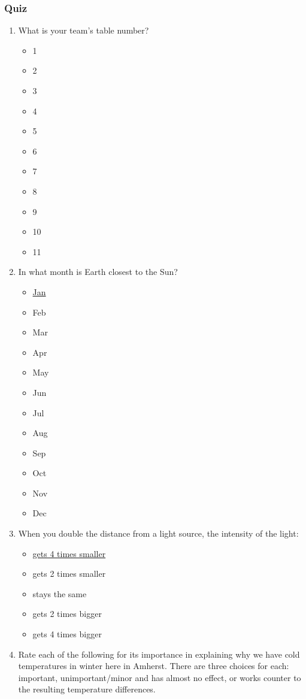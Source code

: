 \documentclass[12pt]{article}
\begin{document}
\subsubsection{Quiz}
\begin{enumerate}
\item
What is your team's table number?
\begin{itemize}
    \item 1
    \item 2
    \item 3
    \item 4
    \item 5
    \item 6
    \item 7
    \item 8
    \item 9
    \item 10
    \item 11
\end{itemize}
\item
In what month is Earth closest to the Sun?
\begin{itemize}
    \item \underline{Jan}
    \item Feb
    \item Mar
    \item Apr
    \item May
    \item Jun
    \item Jul
    \item Aug
    \item Sep
    \item Oct
    \item Nov
    \item Dec
\end{itemize}
\item
When you double the distance from a light source, the intensity of the light:
\begin{itemize}
    \item \underline{gets 4 times smaller}
    \item gets 2 times smaller
    \item stays the same
    \item gets 2 times bigger
    \item gets 4 times bigger 
\end{itemize}
\item
Rate each of the following for its importance in explaining why we have cold temperatures in winter here in Amherst. There are three choices for each: important, unimportant/minor and has almost no effect, or works counter to the resulting temperature differences.

\end{enumerate}
\end{document}
